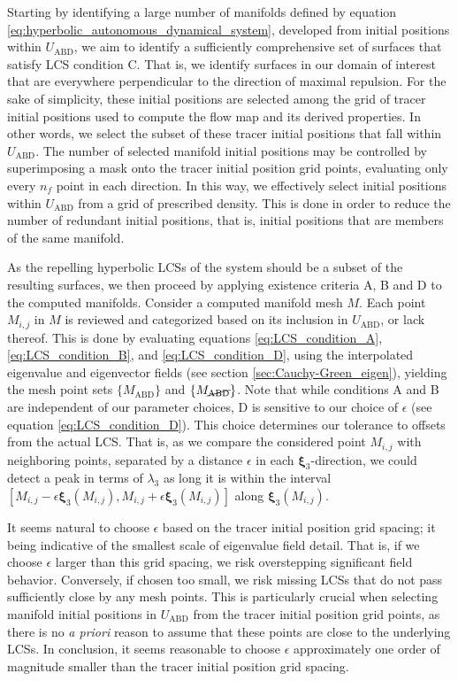 Starting by identifying a large number of manifolds defined by equation \eqref{eq:hyperbolic_autonomous_dynamical_system}, developed from initial positions within $U_{\text{ABD}}$, we aim to identify a sufficiently comprehensive set of surfaces that satisfy LCS condition C. That is, we identify surfaces in our domain of interest that are everywhere perpendicular to the direction of maximal repulsion. For the sake of simplicity, these initial positions are selected among the grid of tracer initial positions used to compute the flow map and its derived properties. In other words, we select the subset of these tracer initial positions that fall within $U_{\text{ABD}}$. The number of selected manifold initial positions may be controlled by superimposing a mask onto the tracer initial position grid points, evaluating only every $n_f$ point in each direction. In this way, we effectively select initial positions within $U_{\text{ABD}}$ from a grid of prescribed density. This is done in order to reduce the number of redundant initial positions, that is, initial positions that are members of the same manifold. 

As the repelling hyperbolic LCSs of the system should be a subset of the resulting surfaces, we then proceed by applying existence criteria A, B and D to the computed manifolds. Consider a computed manifold mesh $M$. Each point $M_{i,j}$ in $M$ is reviewed and categorized based on its inclusion in $U_{\text{ABD}}$, or lack thereof. This is done by evaluating equations \eqref{eq:LCS_condition_A}, \eqref{eq:LCS_condition_B}, and \eqref{eq:LCS_condition_D}, using the interpolated eigenvalue and eigenvector fields (see section \ref{sec:Cauchy-Green_eigen}), yielding the mesh point sets $\{M_{\text{ABD}}\}$ and $\{M_{\cancel{\text{ABD}}}\}$. Note that while conditions A and B are independent of our parameter choices, D is sensitive to our choice of $\epsilon$ (see equation \eqref{eq:LCS_condition_D}). This choice determines our tolerance to offsets from the actual LCS. That is, as we compare the considered point $M_{i,j}$ with neighboring points, separated by a distance $\epsilon$ in each $\bm{\xi}_3$-direction, we could detect a peak in terms of $\lambda_3$ as long it is within the interval $[M_{i,j}-\epsilon\bm{\xi}_3(M_{i,j}),M_{i,j}+\epsilon\bm{\xi}_3(M_{i,j})]$ along $\bm{\xi}_3(M_{i,j})$. 

It seems natural to choose $\epsilon$ based on the tracer initial position grid spacing; it being indicative of the smallest scale of eigenvalue field detail. That is, if we choose $\epsilon$ larger than this grid spacing, we risk overstepping significant field behavior. Conversely, if chosen too small, we risk missing LCSs that do not pass sufficiently close by any mesh points. This is particularly crucial when selecting manifold initial positions in $U_{\text{ABD}}$ from the tracer initial position grid points, as there is no \textit{a priori} reason to assume that these points are close to the underlying LCSs. In conclusion, it seems reasonable to choose $\epsilon$ approximately one order of magnitude smaller than the tracer initial position grid spacing.

